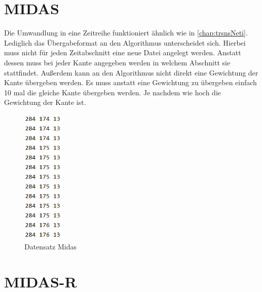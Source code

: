 \section{MIDAS}
\label{chap:trsnsMidas}
Die Umwandlung in eine Zeitreihe funktioniert ähnlich wie in \autoref{chap:trsnsNeti}. Lediglich das Übergabeformat an den Algorithmus unterscheidet sich. Hierbei muss nicht für jeden Zeitabschnitt eine neue Datei angelegt werden. Anstatt dessen muss bei jeder Kante angegeben werden in welchem Abschnitt sie stattfindet. Außerdem kann an den Algorithmus nicht direkt eine Gewichtung der Kante übergeben werden. Es muss anstatt eine Gewichtung zu übergeben einfach 10 mal die gleiche Kante übergeben werden. Je nachdem wie hoch die Gewichtung der Kante ist.

\begin{figure}[H]
	\centering
	\includegraphics[width=2cm]{fig/tsToNet/midasData}
	\caption{Datensatz Midas}
	\label{img:tsToNetMiData}
\end{figure}


\section{MIDAS-R}
\label{chap:trsnsMidasR}
